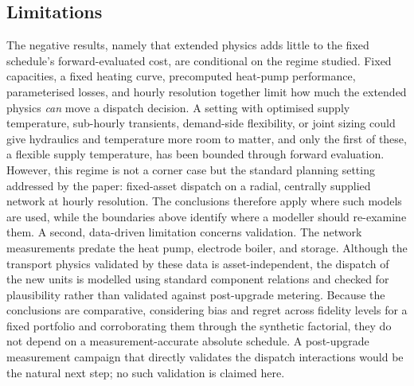 \documentclass[a4paper,fleqn]{cas-sc}
\begin{document}
\subsection{Limitations}
The negative results, namely that extended physics adds little to the fixed schedule's
forward-evaluated cost, are conditional on the regime studied. Fixed capacities, a fixed
heating curve, precomputed heat-pump performance, parameterised losses, and hourly resolution
together limit how much the extended physics \emph{can} move a dispatch decision. A setting with
optimised supply temperature, sub-hourly transients, demand-side flexibility, or joint sizing
could give hydraulics and temperature more room to matter, and only the first of these, a
flexible supply temperature, has been bounded through forward evaluation. However, this regime
is not a corner case but the standard planning setting addressed by the paper: fixed-asset
dispatch on a radial, centrally supplied network at hourly resolution. The conclusions
therefore apply where such models are used, while the boundaries above identify where a
modeller should re-examine them. A second, data-driven limitation concerns validation. The
network measurements predate the heat pump, electrode boiler, and storage. Although the
transport physics validated by these data is asset-independent, the dispatch of the new units
is modelled using standard component relations and checked for plausibility rather than
validated against post-upgrade metering. Because the conclusions are comparative, considering
bias and regret across fidelity levels for a fixed portfolio and corroborating them through the
synthetic factorial, they do not depend on a measurement-accurate absolute schedule. A
post-upgrade measurement campaign that directly validates the dispatch interactions would be
the natural next step; no such validation is claimed here.
\end{document}
